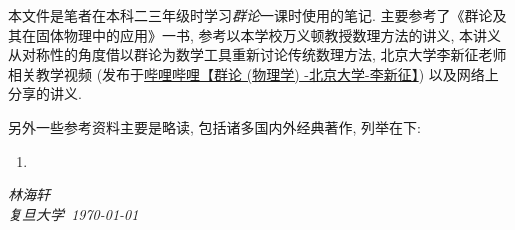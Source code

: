     本文件是笔者在本科二三年级时学习\emph{群论}一课时使用的笔记. 主要参考了《群论及其在固体物理中的应用》\cite{Xu1994}一书, 参考以本学校万义顿教授数理方法的讲义\cite{Wan2024}, 本讲义从对称性的角度借以群论为数学工具重新讨论传统数理方法, 北京大学李新征老师相关教学视频 (发布于\href{https://www.bilibili.com/video/BV1Ux4y177BH?vd_source=d630661fd733349495a9252445d0c4a4}{哔哩哔哩【群论 (物理学) -北京大学-李新征】}) 以及网络上分享的讲义.

    另外一些参考资料主要是略读, 包括诸多国内外经典著作, 列举在下:
    \begin{enumerate}
        \item 
    \end{enumerate}

    \vspace{2cm}
    \begin{flushright}
        \textit{林海轩} \\[1em]
        \textit{复旦大学\ \today}
    \end{flushright}